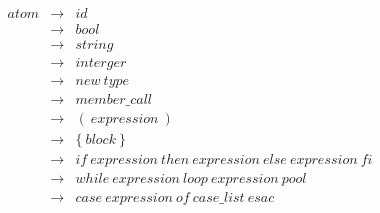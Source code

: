 \documentclass{article}
\begin{document}
\begin{eqnarray*}                                          
    atom             & \rightarrow & id \\
                     & \rightarrow & bool \\
                     & \rightarrow & string \\
                     & \rightarrow & interger \\
                     & \rightarrow & new \ type \\
                     & \rightarrow & member\_call \\
                     & \rightarrow & ( \ expression \ )\\
                     & \rightarrow & \{ \ block \ \}\\    
                     & \rightarrow & if \ expression \ then \ expression \ else \ expression \ fi \\
                     & \rightarrow & while \ expression \ loop \ expression \ pool\\      
                     & \rightarrow & case \ expression \ of \ case\_list \ esac \\          
\end{eqnarray*}
\end{document}
